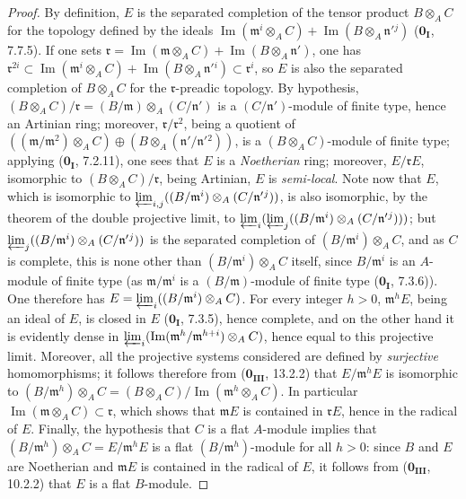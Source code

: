 \begin{proof}
By definition, $E$ is the separated completion of the tensor product $B\otimes_A C$ for the topology defined by the ideals $\operatorname{Im}(\mathfrak{m}^i\otimes_A C)+\operatorname{Im}(B\otimes_A \mathfrak{n}'{}^j)$ ($\mathbf{0_I}$, 7.7.5).
If one sets $\mathfrak{r}=\operatorname{Im}(\mathfrak{m}\otimes_A C)+\operatorname{Im}(B\otimes_A \mathfrak{n}')$, one has $\mathfrak{r}^{2i}\subset\operatorname{Im}(\mathfrak{m}^i\otimes_A C)+\operatorname{Im}(B\otimes_A \mathfrak{n}'{}^i)\subset\mathfrak{r}^i$, so $E$ is also the separated completion of $B\otimes_A C$ for the $\mathfrak{r}$-preadic topology.
By hypothesis, $(B\otimes_A C)/\mathfrak{r}=(B/\mathfrak{m})\otimes_A (C/\mathfrak{n}')$ is a $(C/\mathfrak{n}')$-module of finite type, hence an Artinian ring;
moreover, $\mathfrak{r}/\mathfrak{r}^2$, being a quotient of $((\mathfrak{m}/\mathfrak{m}^2)\otimes_A C)\oplus(B\otimes_A (\mathfrak{n}'/\mathfrak{n}'{}^2))$, is a $(B\otimes_A C)$-module of finite type; applying ($\mathbf{0_I}$, 7.2.11), one sees that $E$ is a \emph{Noetherian} ring; moreover, $E/\mathfrak{r}E$, isomorphic to $(B\otimes_A C)/\mathfrak{r}$, being Artinian, $E$ is \emph{semi-local}.
Note now that $E$, which is isomorphic to $\varprojlim_{i,j}((B/\mathfrak{m}^i)\otimes_A(C/\mathfrak{n}'{}^j))$, is also isomorphic, by the theorem of the double projective limit, to $\varprojlim_i(\varprojlim_j((B/\mathfrak{m}^i)\otimes_A (C/\mathfrak{n}'{}^j)))$; but $\varprojlim_j((B/\mathfrak{m}^i)\otimes_A (C/\mathfrak{n}'{}^j))$
is the separated completion of $(B/\mathfrak{m}^i)\otimes_A C$, and as $C$ is complete, this is none other than $(B/\mathfrak{m}^i)\otimes_A C$ itself, since $B/\mathfrak{m}^i$ is an $A$-module of finite type (as $\mathfrak{m}/\mathfrak{m}^i$ is a $(B/\mathfrak{m})$-module of finite type ($\mathbf{0_I}$, 7.3.6)).
One therefore has $E=\varprojlim_i((B/\mathfrak{m}^i)\otimes_A C)$.
For every integer $h>0$, $\mathfrak{m}^h E$, being an ideal of $E$, is closed in $E$ ($\mathbf{0_I}$, 7.3.5), hence complete, and on the other hand it is evidently dense in $\varprojlim_i(\operatorname{Im}(\mathfrak{m}^h/\mathfrak{m}^{h+i})\otimes_A C)$, hence equal to this projective limit.
Moreover, all the projective systems considered are defined by \emph{surjective} homomorphisms; it follows therefore from ($\mathbf{0_{III}}$, 13.2.2) that $E/\mathfrak{m}^h E$ is isomorphic to $(B/\mathfrak{m}^h)\otimes_A C = (B\otimes_A C)/\operatorname{Im}(\mathfrak{m}^h\otimes_A C)$.
In particular $\operatorname{Im}(\mathfrak{m}\otimes_A C)\subset\mathfrak{r}$, which shows that $\mathfrak{m}E$ is contained in $\mathfrak{r}E$, hence in the radical of $E$.
Finally, the hypothesis that $C$ is a flat $A$-module implies that $(B/\mathfrak{m}^h)\otimes_A C = E/\mathfrak{m}^h E$ is a flat $(B/\mathfrak{m}^h)$-module for all $h>0$: since $B$ and $E$ are Noetherian and $\mathfrak{m}E$ is contained in the radical of $E$, it follows from ($\mathbf{0_{III}}$, 10.2.2) that $E$ is a flat $B$-module.
\end{proof}

